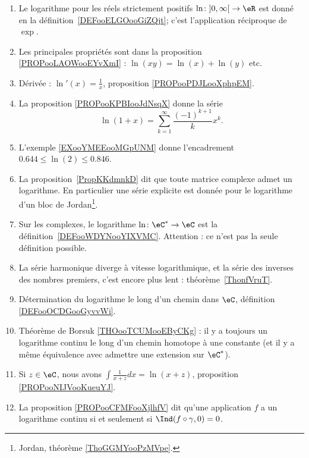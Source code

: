 
\begin{enumerate}
	\item
	      Le logarithme pour les réels strictement positifs \( \ln\colon \mathopen] 0 , \infty \mathclose[\to \eR\) est donné en la définition~\ref{DEFooELGOooGiZQjt}; c'est l'application réciproque de \( \exp\).
	\item
	      Les principales propriétés sont dans la proposition \ref{PROPooLAOWooEYvXmI} : \( \ln(xy)=\ln(x)+\ln(y)\) etc.
	\item
	      Dérivée : \( \ln'(x)=\frac{1}{ x }\), proposition \ref{PROPooPDJLooXphpEM}.
	\item
	      La proposition \ref{PROPooKPBIooJdNsqX} donne la série
	      \begin{equation}
		      \ln(1+x)=\sum_{k=1}^{\infty}\frac{ (-1)^{k+1} }{ k }x^k.
	      \end{equation}
	\item
	      L'exemple \ref{EXooYMEEooMGpUNM} donne l'encadrement \( 0.644\leq \ln(2)\leq 0.846\).
	\item
	      La proposition~\ref{PropKKdmnkD} dit que toute matrice complexe admet un logarithme. En particulier une série explicite est donnée pour le logarithme d'un bloc de Jordan\footnote{Jordan, théorème \ref{ThoGGMYooPzMVpe}.}.
	\item
	      Sur les complexes, le logarithme \( \ln \colon \eC^*\to \eC\) est la définition~\ref{DEFooWDYNooYIXVMC}. Attention : ce n'est pas la seule définition possible.
	\item
	      La série harmonique diverge à vitesse logarithmique, et la série des inverses des nombres premiers, c'est encore plus lent : théorème~\ref{ThonfVruT}.
      \item
          Détermination du logarithme le long d'un chemin dans \( \eC\), définition \ref{DEFooOCDGooGyvvWi}.
      \item
          Théorème de Borsuk \ref{THOooTCUMooEByCKg} : il y a toujours un logarithme continu le long d'un chemin homotope à une constante (et il y a même équivalence avec admettre une extension sur \( \eC^*\)).
      \item
          Si \( z\in \eC\), nous avons $\int\frac{1}{ x+z }dx=\ln(x+z)$, proposition \ref{PROPooNIJVooKueuYJ}.
      \item
          La proposition \ref{PROPooCFMFooXjlhfV} dit qu'une application \( f\) a un logarithme continu si et seulement si \( \Ind(f\circ\gamma,0)=0\).
\end{enumerate}

